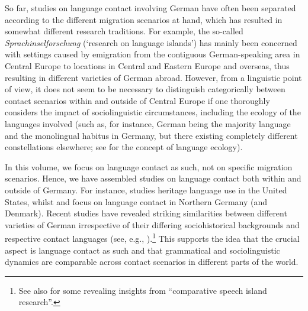 \documentclass[output=paper]{langsci/langscibook}
\begin{document}
So far, studies on language contact involving German have often been separated according to the different migration scenarios at hand, which has resulted in somewhat different research traditions. For example, the so-called \textit{Sprachinselforschung} (‘research on language islands’) has mainly been concerned with settings caused by emigration from the contiguous German-speaking area in Central Europe to locations in Central and Eastern Europe and overseas, thus resulting in different varieties of German abroad. However, from a linguistic point of view, it does not seem to be necessary to distinguish categorically between contact scenarios within and outside of Central Europe if one thoroughly considers the impact of sociolinguistic circumstances, including the ecology of the languages involved (such as, for instance, German being the majority language and the monolingual habitus in Germany, but there existing completely different constellations elsewhere; see \citealt{haugen_ecology_1972} for the concept of language ecology). 

In this volume, we focus on language contact as such, not on specific migration scenarios. Hence, we have assembled studies on language contact both within and outside of Germany. For instance,  studies heritage language use in the United States, whilst  and  focus on language contact in Northern Germany (and Denmark). Recent studies have revealed striking similarities between different varieties of German irrespective of their differing sociohistorical backgrounds and respective contact languages (see, e.g., \citealt{wiese_deutsch_2014}).\footnote{See also \citet{rosenberg_comparative_2003} for some revealing insights from “comparative speech island research”.} This supports the idea that the crucial aspect is language contact as such and that grammatical and sociolinguistic dynamics are comparable across contact scenarios in different parts of the world.
\end{document}
